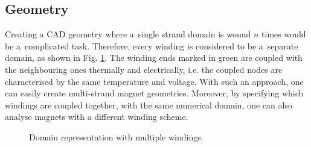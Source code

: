 
\subsection{Geometry}
\label{subsection:algorithms_geometry}

Creating a CAD geometry where a~single strand domain is wound $n$ times would be a~complicated task. Therefore, every winding is considered to be a~separate domain, as shown in Fig. \ref{fig:winding_geom_scheme}. The winding ends marked in green are coupled with the neighbouring ones thermally and electrically, i.e. the coupled nodes are characterised by the same temperature and voltage. With such an approach, one can easily create multi-strand magnet geometries. Moreover, by specifying which windings are coupled together, with the same numerical domain, one can also analyse magnets with a different winding scheme.

\begin{figure}[H]
\centering
{}
\caption{Domain representation with multiple windings.}
\label{fig:winding_geom_scheme}
\end{figure}


